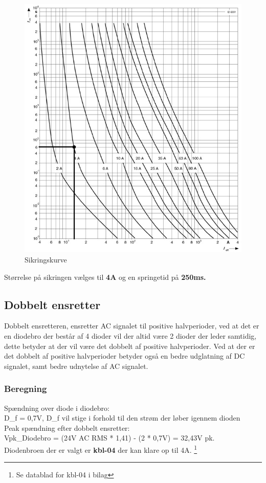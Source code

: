 \begin{figure}[H]
\centering
\includegraphics[scale=0.7]{billeder/Sikringskurve_PS}
\caption{Sikringskurve}
\label{fig:Sikringskurve_PS}
\end{figure}
Størrelse på sikringen vælges til \textbf{4A} og en springetid på \textbf{250ms.}
\subsection{Dobbelt ensretter}
Dobbelt ensretteren, ensretter AC signalet til positive halvperioder, ved at det er en diodebro der består af 4 dioder vil der altid være 2 dioder der leder samtidig, dette betyder at der vil være det dobbelt af positive halvperioder. Ved at der er det dobbelt af positive halvperioder betyder også en bedre udglatning af DC signalet, samt bedre udnytelse af AC signalet.
\newpage
\subsubsection{Beregning}
Spændning over diode i diodebro:\\
D\_f = 0,7V, D\_f vil stige i forhold til den strøm der løber igennem dioden\\
Peak spændning efter dobbelt ensretter:\\
Vpk\_Diodebro = (24V AC RMS * 1,41) - (2 * 0,7V) = 32,43V pk.\\
Diodenbroen der er valgt er \textbf{kbl-04} der kan klare op til 4A. 
\footnote{Se datablad for kbl-04 i bilag}
\newpage


